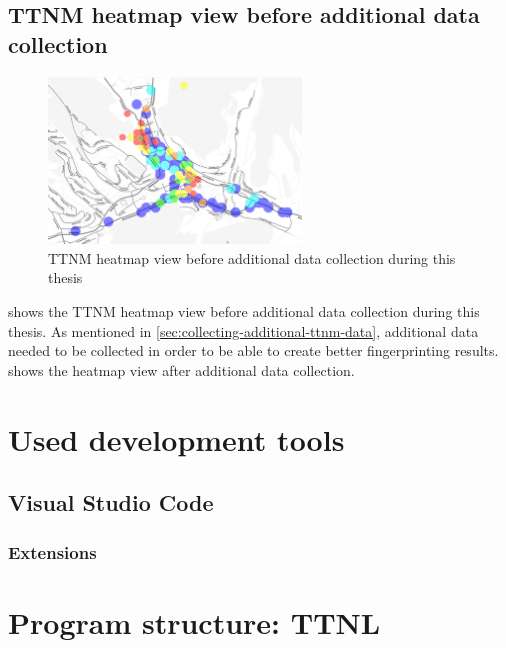 \subsection{\acl{TTNM} heatmap view before additional data collection}

\begin{figure}
    \centering
    \includegraphics[width=0.6\textwidth]{pictures/ttn-mapper/ttnmapper_heatmap_before.png}
    \caption{\ac{TTNM} heatmap view before additional data collection during this thesis\label{pic:ttnm-before-data-collection}}
\end{figure}

 shows the \ac{TTNM} heatmap view before additional data collection during this thesis.
As mentioned in \cref{sec:collecting-additional-ttnm-data}, additional data needed to be collected in order to be able to create better fingerprinting results.
 shows the heatmap view after additional data collection.

\section{Used development tools}


\subsection{Visual Studio Code}

\subsubsection{Extensions}

\section{Program structure: \acf{TTNL}}\label{section:ttnl}


